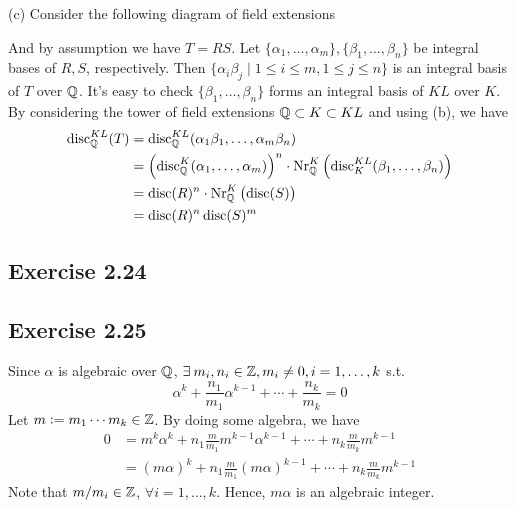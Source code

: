 \documentclass[../Marcus.tex]{subfiles}
\begin{document}
(c) Consider the following diagram of field extensions
\begin{center}
\end{center}
And by assumption we have $T=RS$. Let $\{\alpha_1,\ldots,\alpha_m\},\{\beta_1,\ldots,\beta_n\}$ be integral bases of $R,S$, respectively. Then $\{\alpha_i\beta_j\mid 1\leq i\leq m, 1\leq j\leq n\}$ is an integral basis of $T$ over $\mathbb{Q}$. It's easy to check $\{\beta_1,\ldots,\beta_n\}$ forms an integral basis of $KL$ over $K$. By considering the tower of field extensions $\mathbb{Q}\subset K\subset KL$ and using (b), we have
\begin{align*}
    \operatorname{disc}^{KL}_{\mathbb{Q}}(T) &= \operatorname{disc}^{KL}_{\mathbb{Q}}(\alpha_1\beta_1,\ldots,\alpha_m\beta_n)\\
    &= \left(\operatorname{disc}^K_{\mathbb{Q}}(\alpha_1,\ldots,\alpha_m)\right)^n\cdot \operatorname{Nr}^K_{\mathbb{Q}}\left(\operatorname{disc}^{KL}_K(\beta_1,\ldots,\beta_n)\right)\\
    &= \operatorname{disc}(R)^n\cdot \operatorname{Nr}^K_{\mathbb{Q}}\left(\operatorname{disc}(S)\right)\\
    &= \operatorname{disc}(R)^n\operatorname{disc}(S)^m
\end{align*}

\subsection*{Exercise 2.24}

\subsection*{Exercise 2.25}

Since $\alpha$ is algebraic over $\mathbb{Q}$, $\exists m_i,n_i \in \ZZ, m_i \neq 0, i=1,\ldots,k$ s.t. $$\alpha^k + \frac{n_1}{m_1}\alpha^{k-1} + \cdots + \frac{n_k}{m_k} = 0$$ 
Let $m:=m_1\cdots m_k\in\mathbb{Z}$. By doing some algebra, we have
\begin{align*}
    0 &= m^k\alpha^k + n_1\frac{m}{m_1}m^{k-1}\alpha^{k-1} + \cdots + n_k\frac{m}{m_k}m^{k-1} \\
    &= (m\alpha)^k + n_1\frac{m}{m_1}(m\alpha)^{k-1} + \cdots + n_k\frac{m}{m_k}m^{k-1}
\end{align*}
Note that $m/m_i \in \mathbb{Z}$, $\forall i=1,\ldots,k$. Hence, $m\alpha$ is an algebraic integer.
\end{document}
